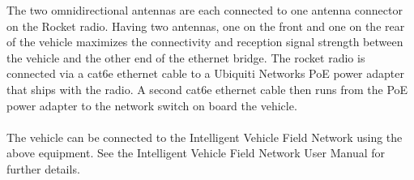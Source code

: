 \noindent The two omnidirectional antennas are each connected to one antenna connector on the Rocket radio. Having two antennas, one on the front and one on the rear of the vehicle maximizes the connectivity and reception signal strength between the vehicle and the other end of the ethernet bridge. The rocket radio is connected via a cat6e ethernet cable to a Ubiquiti Networks PoE power adapter that ships with the radio. A second cat6e ethernet cable then runs from the PoE power adapter to the network switch on board the vehicle.\\ \\
%
\noindent The vehicle can be connected to the Intelligent Vehicle Field Network using the above equipment. See the Intelligent Vehicle Field Network User Manual for further details.

